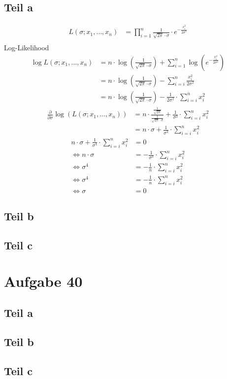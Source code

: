 \documentclass[10pt,a4paper]{article}
\begin{document}
\subsection{Teil a}

\begin{align*}
  L(\sigma; x_{1}, \dots, x_{n}) & = \prod_{i = 1}^{n} \frac{1}{\sqrt{2 \pi} \cdot \sigma} \cdot e^{-\frac{x_{i}^{2}}{2\sigma^{2}}}\\
\end{align*}
Log-Likelihood
\begin{align*}
  \log L(\sigma; x_{1}, \dots, x_{n}) & = n \cdot \log(\frac{1}{\sqrt{2 \pi} \cdot \sigma}) + \sum_{i = 1}^{n} \log\left( e^{-\frac{x_{i}^{2}}{2\sigma^{2}}} \right)\\
  & = n \cdot \log(\frac{1}{\sqrt{2 \pi} \cdot \sigma}) - \sum_{i = i}^{n} \frac{x_{i}^{2}}{2\sigma^{2}}\\
  & = n \cdot \log(\frac{1}{\sqrt{2 \pi} \cdot \sigma}) - \frac{1}{2\sigma^{2}} \cdot \sum_{i = i}^{n} x_{i}^{2}
\end{align*}
\begin{align*}
  \frac{\partial}{\partial \sigma} \log(L(\sigma; x_{1}, \dots, x_{n})) & = n \cdot \frac{\frac{1}{\sqrt{2 \pi}}}{\frac{1}{\sqrt{2 \pi} \cdot \sigma}} + \frac{1}{\sigma^{3}} \cdot \sum_{i = i}^{n} x_{i}^{2}\\
  & = n \cdot \sigma + \frac{1}{\sigma^{3}} \cdot \sum_{i = i}^{n} x_{i}^{2}
\end{align*}
\begin{align*}
  n \cdot \sigma + \frac{1}{\sigma^{3}} \cdot \sum_{i = i}^{n} x_{i}^{2} & = 0\\
  \Leftrightarrow n \cdot \sigma & = -\frac{1}{\sigma^{3}} \cdot \sum_{i = i}^{n} x_{i}^{2}\\
  \Leftrightarrow \sigma^{4} & = -\frac{1}{n} \cdot \sum_{i = i}^{n} x_{i}^{2}\\
  \Leftrightarrow \sigma^{4} & = -\frac{1}{n} \cdot \sum_{i = i}^{n} x_{i}^{2}\\
  \Leftrightarrow \sigma & = 0
\end{align*}

\subsection{Teil b}

\subsection{Teil c}

\section{Aufgabe 40}

\subsection{Teil a}

\subsection{Teil b}

\subsection{Teil c}
\end{document}
